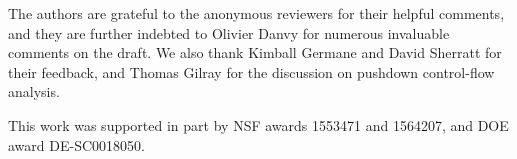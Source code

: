 \documentclass[acmsmall, screen]{acmart}\settopmatter{}
\begin{document}
\begin{acks}                            %
  The authors are grateful to the anonymous reviewers for their
  helpful comments, and they are further indebted to Olivier Danvy
  for numerous invaluable comments on the draft. We also thank
  Kimball Germane and David Sherratt for their feedback, and
  Thomas Gilray for the discussion on pushdown control-flow analysis.

  This work was supported in part by 
  NSF awards 1553471 and 1564207, and DOE award DE-SC0018050.
\end{acks}




\end{document}
